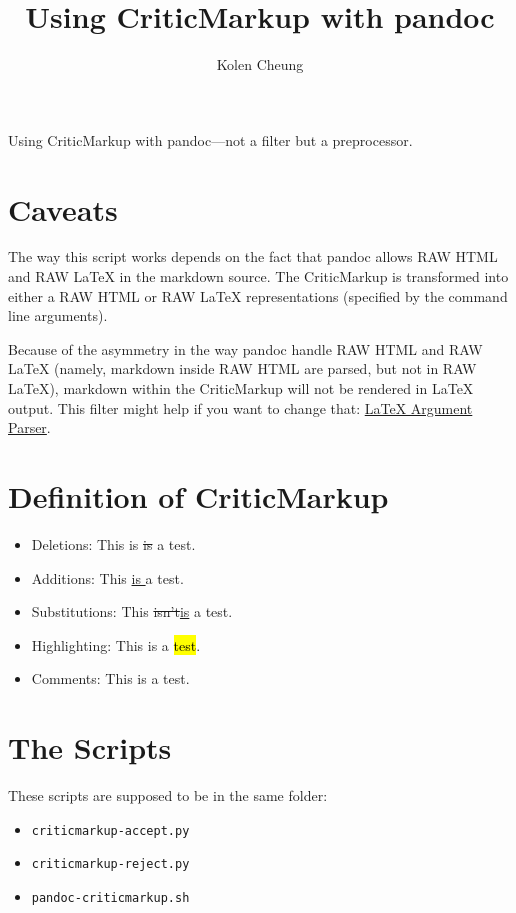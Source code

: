 \documentclass[]{article}
\title{Using CriticMarkup with pandoc}
\author{Kolen Cheung}
\date{}
\providecommand{\tightlist}{%
  \setlength{\itemsep}{0pt}\setlength{\parskip}{0pt}}
\begin{document}
\maketitle

Using CriticMarkup with pandoc---not a filter but a preprocessor.

\section{Caveats}\label{caveats}

The way this script works depends on the fact that pandoc allows RAW
HTML and RAW LaTeX in the markdown source. The CriticMarkup is
transformed into either a RAW HTML or RAW LaTeX representations
(specified by the command line arguments).

Because of the asymmetry in the way pandoc handle RAW HTML and RAW LaTeX
(namely, markdown inside RAW HTML are parsed, but not in RAW LaTeX),
markdown within the CriticMarkup will not be rendered in LaTeX output.
This filter might help if you want to change that:
\href{https://gist.github.com/mpickering/f1718fcdc4c56273ed52}{LaTeX
Argument Parser}.

\section{Definition of CriticMarkup}\label{definition-of-criticmarkup}

\begin{itemize}
\tightlist
\item
  Deletions: This is \st{is }a test.
\item
  Additions: This \underline{is }a test.
\item
  Substitutions: This \st{isn't}\underline{is} a test.
\item
  Highlighting: This is a \hl{test}.
\item
  Comments: This is a test.
\end{itemize}

\section{The Scripts}\label{the-scripts}

These scripts are supposed to be in the same folder:

\begin{itemize}
\tightlist
\item
  \texttt{criticmarkup-accept.py}
\item
  \texttt{criticmarkup-reject.py}
\item
  \texttt{pandoc-criticmarkup.sh}
\end{itemize}
\end{document}
